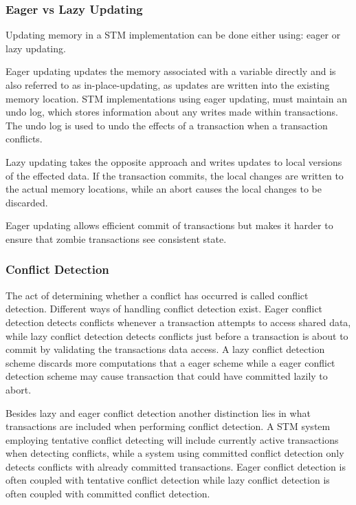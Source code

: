 \subsubsection{Eager vs Lazy Updating}
Updating memory in a \ac{STM} implementation can be done either using: eager or lazy updating.

Eager updating updates the memory associated with a variable directly and is also referred to as in-place-updating, as updates are written into the existing memory location\cite[p. 35]{afek2011lowering}. \ac{STM} implementations using eager updating, must maintain an undo log, which stores information about any writes made within transactions. The undo log is used to undo the effects of a transaction when a transaction conflicts\cite[p. 2084]{herlihy2011tm}.

Lazy updating takes the opposite approach and writes updates to local versions of the effected data\cite[p. 2084]{herlihy2011tm}. If the transaction commits, the local changes are written to the actual memory locations, while an abort causes the local changes to be discarded.

Eager updating allows efficient commit of transactions but makes it harder to ensure that zombie transactions see consistent state\cite[p. 2084]{herlihy2011tm}.

\subsubsection{Conflict Detection}
\label{sec:stm_conflict_detection}
The act of determining whether a conflict has occurred is called conflict detection\cite[p. 20]{harris2010transactional}. Different ways of handling conflict detection exist. Eager conflict detection detects conflicts whenever a transaction attempts to access shared data, while lazy conflict detection detects conflicts just before a transaction is about to commit by validating the transactions data access\cite[p. 21]{harris2010transactional}. A lazy conflict detection scheme discards more computations that a eager scheme while a eager conflict detection scheme may cause transaction that could have committed lazily to abort\cite[p. 21]{harris2010transactional}.

Besides lazy and eager conflict detection another distinction lies in what transactions are included when performing conflict detection. A \ac{STM} system employing tentative conflict detecting will include currently active transactions when detecting conflicts, while a system using committed conflict detection only detects conflicts with already committed transactions. Eager conflict detection is often coupled with tentative conflict detection while lazy conflict detection is often coupled with committed conflict detection\cite[p. 22]{harris2010transactional}.

